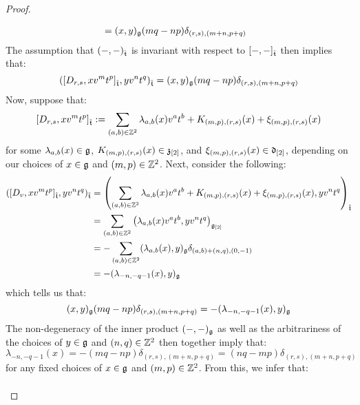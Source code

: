 \begin{proof}
\begin{enumerate}
$$\begin{aligned}
                                & = (x, y)_{\g} (mq - np) \delta_{(r, s), (m + n, p + q)}
                            \end{aligned}
                        $$
                    The assumption that $(-, -)_{\extendedtoroidal}$ is invariant with respect to $[-, -]_{\extendedtoroidal}$ then implies that:
                        $$( [D_{r, s}, x v^m t^p]_{\extendedtoroidal}, y v^n t^q )_{\extendedtoroidal} = (x, y)_{\g} (mq - np) \delta_{(r, s), (m + n, p + q)}$$
                    Now, suppose that:
                        $$[D_{r, s}, x v^m t^p]_{\extendedtoroidal} := \sum_{(a, b) \in \Z^2} \lambda_{a, b}(x) v^a t^b + K_{(m, p), (r, s)}(x) + \xi_{(m, p), (r, s)}(x)$$
                    for some $\lambda_{a, b}(x) \in \g$, $K_{(m, p), (r, s)}(x) \in \z_{[2]}$, and $\xi_{(m, p), (r, s)}(x) \in \d_{[2]}$, depending on our choices of $x \in \g$ and $(m, p) \in \Z^2$. Next, consider the following:
                        $$
                            \begin{aligned}
                                ( [D_v, x v^m t^p]_{\extendedtoroidal}, y v^n t^q )_{\extendedtoroidal} & = \left( \sum_{(a, b) \in \Z^2} \lambda_{a, b}(x) v^a t^b + K_{(m, p), (r, s)}(x) + \xi_{(m, p), (r, s)}(x), y v^n t^q \right)_{\extendedtoroidal}
                                \\
                                & = \sum_{(a, b) \in \Z^2} \left( \lambda_{a, b}(x) v^a t^b, y v^n t^q \right)_{\g_{[2]}}
                                \\
                                & = -\sum_{(a, b) \in \Z^2} (\lambda_{a, b}(x), y)_{\g} \delta_{ (a, b) + (n, q), (0, -1) }
                                \\
                                & = -(\lambda_{-n, -q - 1}(x), y)_{\g}
                            \end{aligned}
                        $$
                    which tells us that:
                        $$(x, y)_{\g} (mq - np) \delta_{(r, s), (m + n, p + q)} = -(\lambda_{-n, -q - 1}(x), y)_{\g}$$
                    The non-degeneracy of the inner product $(-, -)_{\g}$ as well as the arbitrariness of the choices of $y \in \g$ and $(n, q) \in \Z^2$ then together imply that:
                        $$\lambda_{-n, -q - 1}(x) = -(mq - np) \delta_{(r, s), (m + n, p + q)} = (nq - mp) \delta_{(r, s), (m + n, p + q)}$$
                    for any fixed choices of $x \in \g$ and $(m, p) \in \Z^2$. From this, we infer that:
                        $$
                            \begin{aligned}

\end{aligned}$$
\end{enumerate}
\end{proof}
